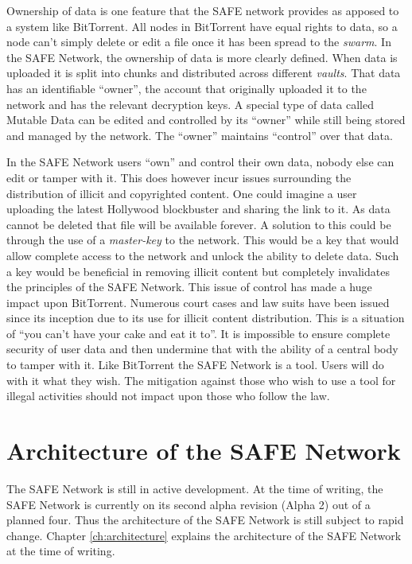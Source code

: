 Ownership of data is one feature that the SAFE network provides as apposed to a system like BitTorrent. All nodes in BitTorrent have equal rights to data, so a node can't simply delete or edit a file once it has been spread to the \textit{swarm}. In the SAFE Network, the ownership of data is more clearly defined. When data is uploaded it is split into chunks and distributed across different \textit{vaults}. That data has an identifiable ``owner'', the account that originally uploaded it to the network and has the relevant decryption keys. A special type of data called Mutable Data can be edited and controlled by its ``owner'' while still being stored and managed by the network. The ``owner'' maintains ``control'' over that data.

In the SAFE Network users ``own'' and control their own data, nobody else can edit or tamper with it. This does however incur issues surrounding the distribution of illicit and copyrighted content. One could imagine a user uploading the latest Hollywood blockbuster and sharing the link to it. As data cannot be deleted that file will be available forever. A solution to this could be through the use of a \textit{master-key} to the network. This would be a key that would allow complete access to the network and unlock the ability to delete data. Such a key would be beneficial in removing illicit content but completely invalidates the principles of the SAFE Network. This issue of control has made a huge impact upon BitTorrent. Numerous court cases and law suits have been issued since its inception due to its use for illicit content distribution. This is a situation of ``you can't have your cake and eat it to''. It is impossible to ensure complete security of user data and then undermine that with the ability of a central body to tamper with it. Like BitTorrent the SAFE Network is a tool. Users will do with it what they wish. The mitigation against those who wish to use a tool for illegal activities should not impact upon those who follow the law.

\section{Architecture of the SAFE Network}

The SAFE Network is still in active development. At the time of writing, the SAFE Network is currently on its second alpha revision (Alpha 2) out of a planned four. Thus the architecture of the SAFE Network is still subject to rapid change. Chapter \ref{ch:architecture} explains the architecture of the SAFE Network at the time of writing.